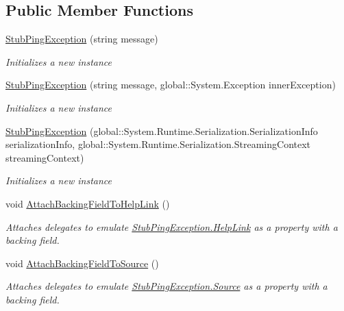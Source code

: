 \subsection*{Public Member Functions}
\begin{DoxyCompactItemize}
\item 
\hyperlink{class_system_1_1_net_1_1_network_information_1_1_fakes_1_1_stub_ping_exception_a8c7239580480ca9b4aa867e1d8efb23f}{Stub\-Ping\-Exception} (string message)
\begin{DoxyCompactList}\small\item\em Initializes a new instance\end{DoxyCompactList}\item 
\hyperlink{class_system_1_1_net_1_1_network_information_1_1_fakes_1_1_stub_ping_exception_aacde0a8f46a6f7d1f030e24ef2c44df0}{Stub\-Ping\-Exception} (string message, global\-::\-System.\-Exception inner\-Exception)
\begin{DoxyCompactList}\small\item\em Initializes a new instance\end{DoxyCompactList}\item 
\hyperlink{class_system_1_1_net_1_1_network_information_1_1_fakes_1_1_stub_ping_exception_a2d35b90e8daf3608cd80a862fe959de1}{Stub\-Ping\-Exception} (global\-::\-System.\-Runtime.\-Serialization.\-Serialization\-Info serialization\-Info, global\-::\-System.\-Runtime.\-Serialization.\-Streaming\-Context streaming\-Context)
\begin{DoxyCompactList}\small\item\em Initializes a new instance\end{DoxyCompactList}\item 
void \hyperlink{class_system_1_1_net_1_1_network_information_1_1_fakes_1_1_stub_ping_exception_a75392ec8509f95cd03e9295ab97009df}{Attach\-Backing\-Field\-To\-Help\-Link} ()
\begin{DoxyCompactList}\small\item\em Attaches delegates to emulate \hyperlink{class_system_1_1_net_1_1_network_information_1_1_fakes_1_1_stub_ping_exception_ac1a62c33b934de6e6f9c0b326dc99852}{Stub\-Ping\-Exception.\-Help\-Link} as a property with a backing field.\end{DoxyCompactList}\item 
void \hyperlink{class_system_1_1_net_1_1_network_information_1_1_fakes_1_1_stub_ping_exception_a1c2e4a2c8b043cd85766b3884f077b41}{Attach\-Backing\-Field\-To\-Source} ()
\begin{DoxyCompactList}\small\item\em Attaches delegates to emulate \hyperlink{class_system_1_1_net_1_1_network_information_1_1_fakes_1_1_stub_ping_exception_ad87f584df6c14b8e5e7e2ac6338cd362}{Stub\-Ping\-Exception.\-Source} as a property with a backing field.\end{DoxyCompactList}\item 

\end{DoxyCompactItemize}
